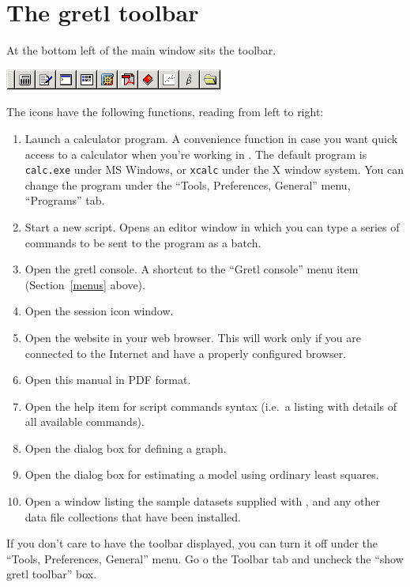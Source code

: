 \section{The gretl toolbar}
\label{toolbar}

At the bottom left of the main window sits the toolbar.

\begin{center}
  \includegraphics[scale=0.5]{figures/toolbar}
\end{center}

The icons have the following functions, reading from left to right:

\begin{enumerate}
\item Launch a calculator program.  A convenience function in case you
  want quick access to a calculator when you're working in
  .  The default program is \verb+calc.exe+ under MS
  Windows, or \verb+xcalc+ under the X window system.  You can change
  the program under the ``Tools, Preferences, General'' menu,
  ``Programs'' tab.
\item Start a new script.  Opens an editor window in which you can
  type a series of commands to be sent to the program as a batch.
\item Open the gretl console.  A shortcut to the ``Gretl console''
  menu item (Section~\ref{menus} above).
\item Open the  session icon window.
\item Open the  website in your web browser.  This will
  work only if you are connected to the Internet and have a properly
  configured browser.
\item Open this manual in PDF format.
\item Open the help item for script commands syntax (i.e.\ a listing
  with details of all available commands).
\item Open the dialog box for defining a graph.
\item Open the dialog box for estimating a model using ordinary least
  squares.
\item Open a window listing the sample datasets supplied with
  , and any other data file collections that have been
  installed.
\end{enumerate}

If you don't care to have the toolbar displayed, you can turn it off
under the ``Tools, Preferences, General'' menu. Go o the Toolbar tab
and uncheck the ``show gretl toolbar'' box.


